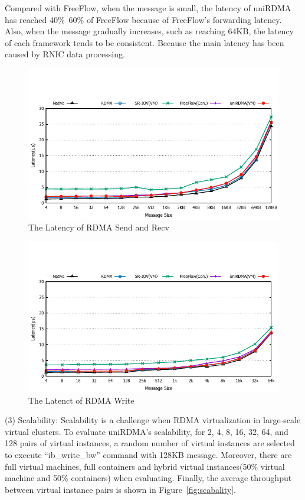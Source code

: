 Compared with FreeFlow, when the message is small, the latency of uniRDMA has reached 40\%~60\% of FreeFlow because of FreeFlow's forwarding latency. Also, when the message gradually increases, such as reaching 64KB, the latency of each framework tends to be consistent. Because the main latency has been caused by RNIC data processing.

\begin{figure}[!ht]
	\centering
	\includegraphics[width=1.0\linewidth]{images/send-lat.pdf}
	\caption{The Latency of RDMA Send and Recv}
	\label{fig:send-lat}
\end{figure}

\begin{figure}[!ht]
	\centering
	\includegraphics[width=1.0\linewidth]{images/write-lat.pdf}
	\caption{The Latenct of RDMA Write}
	\label{fig:write-lat}
\end{figure}
(3) Scalability: 
Scalability is a challenge when RDMA virtualization in large-scale virtual clusters. To evaluate uniRDMA's scalability, for 2, 4, 8, 16, 32, 64, and 128 pairs of virtual instances, a random number of virtual instances are selected to execute ``ib\_write\_bw'' command with 128KB message. Moreover, there are full virtual machines, full containers and hybrid virtual instances(50\% virtual machine and 50\% containers) when evaluating. Finally, the average throughput between virtual instance pairs is shown in Figure~\ref{fig:scabality}.

